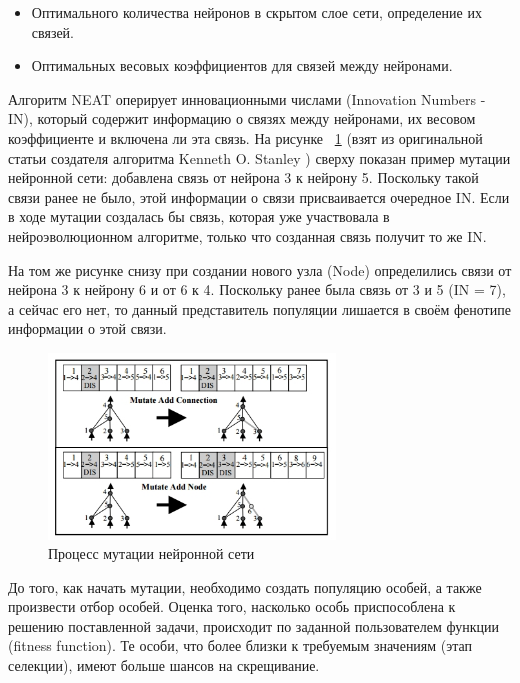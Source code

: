 \documentclass{article}
\begin{document}
\begin{itemize}
    \item Оптимального количества нейронов в скрытом слое сети, определение их связей.
    \item Оптимальных весовых коэффициентов для связей между нейронами.
\end{itemize}

Алгоритм NEAT оперирует инновационными числами (Innovation Numbers - IN), который содержит информацию о связях между нейронами, их весовом коэффициенте и включена ли эта связь. На рисунке ~\ref{fig:Neat1} (взят из оригинальной статьи создателя алгоритма Kenneth O. Stanley \cite{Stanley_NEAT}) сверху показан пример мутации нейронной сети: добавлена связь от нейрона 3 к нейрону 5. Поскольку такой связи ранее не было, этой информации о связи присваивается очередное IN. Если в ходе мутации создалась бы связь, которая уже участвовала в нейроэволюционном алгоритме, только что созданная связь получит то же IN.

На том же рисунке снизу при создании нового узла (Node) определились связи от нейрона 3 к нейрону 6 и от 6 к 4. Поскольку ранее была связь от 3 и 5 (IN = 7), а сейчас его нет, то данный представитель популяции лишается в своём фенотипе  информации о этой связи.

\begin{figure}[h]
	\centering
    \includegraphics[width=3in]{neat1}
    \caption{Процесс мутации нейронной сети }
    \label{fig:Neat1}
\end{figure}

До того, как начать мутации, необходимо создать популяцию особей, а также произвести отбор особей. Оценка того, насколько особь приспособлена к решению поставленной задачи, происходит по заданной пользователем функции (fitness function). Те особи, что более близки к требуемым значениям (этап селекции), имеют больше шансов на скрещивание.
\end{document}
